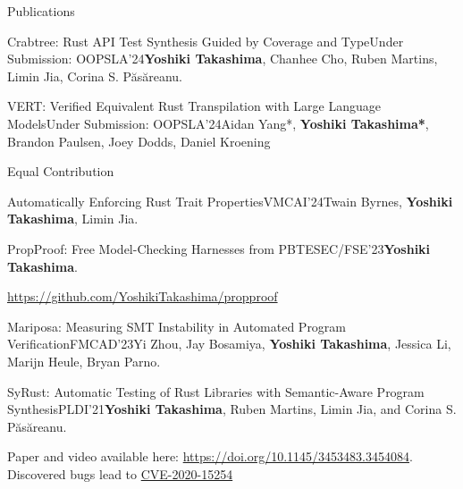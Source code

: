 \documentclass{resume} %
\begin{document}
\begin{rSection}{Publications}
  \begin{rPubsection}{Crabtree: Rust API Test Synthesis Guided by
      Coverage and Type}{Under Submission: OOPSLA'24}{\textbf{Yoshiki
        Takashima}, Chanhee Cho, Ruben Martins, Limin Jia, Corina
      S. P\u{a}s\u{a}reanu.}{}
  \end{rPubsection}

  \begin{rPubsection}{VERT: Verified Equivalent Rust Transpilation
      with Large Language Models}{Under Submission: OOPSLA'24}{Aidan Yang*,
      \textbf{Yoshiki Takashima*}, Brandon Paulsen, Joey Dodds, Daniel
      Kroening}{}

    {\footnotesize *Equal Contribution}
  \end{rPubsection}

  \begin{rPubsection}{Automatically Enforcing Rust Trait
      Properties}{VMCAI'24}{Twain Byrnes, \textbf{Yoshiki Takashima}, Limin
      Jia.}{}
  \end{rPubsection}

  \begin{rPubsection}{PropProof: Free Model-Checking Harnesses from
      PBT}{ESEC/FSE’23}{\textbf{Yoshiki Takashima}.}{}

    {\footnotesize
      \href{https://github.com/YoshikiTakashima/propproof}
      {https://github.com/YoshikiTakashima/propproof}}
  \end{rPubsection}

  \begin{rPubsection}{Mariposa: Measuring SMT Instability in Automated
      Program Verification}{FMCAD'23}{Yi Zhou, Jay Bosamiya, \textbf{Yoshiki
      Takashima}, Jessica Li, Marijn Heule, Bryan Parno.}{}

  \end{rPubsection}

  \begin{rPubsection}{SyRust: Automatic Testing of Rust Libraries with
      Semantic-Aware Program Synthesis}{PLDI'21}{\textbf{Yoshiki Takashima},
      Ruben Martins, Limin Jia, and Corina S. P\u{a}s\u{a}reanu.}{}

    {\footnotesize Paper and video available here:
      \href{https://doi.org/10.1145/3453483.3454084}
      {https://doi.org/10.1145/3453483.3454084}. Discovered bugs lead
      to
      \href{https://nvd.nist.gov/vuln/detail/CVE-2020-15254}{CVE-2020-15254}}
  \end{rPubsection}


\end{rSection}
\end{document}
